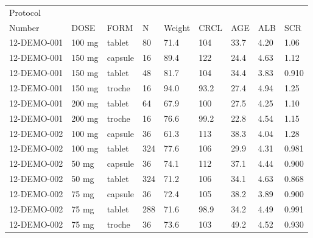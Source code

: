 \documentclass[
]{article}
\newenvironment{Shaded}{\begin{snugshade}}{\end{snugshade}}
\newcommand{\ControlFlowTok}[1]{\textcolor[rgb]{0.13,0.29,0.53}{\textbf{#1}}}
\newcommand{\DataTypeTok}[1]{\textcolor[rgb]{0.13,0.29,0.53}{#1}}
\newcommand{\KeywordTok}[1]{\textcolor[rgb]{0.13,0.29,0.53}{\textbf{#1}}}
\newcommand{\NormalTok}[1]{#1}
\newcommand{\OperatorTok}[1]{\textcolor[rgb]{0.81,0.36,0.00}{\textbf{#1}}}
\newcommand{\StringTok}[1]{\textcolor[rgb]{0.31,0.60,0.02}{#1}}
\begin{document}
\begin{table}[h]
\centering
{\def\arraystretch{1.4}\tabcolsep=5pt
\begin{threeparttable}
\begin{tabular}[h]{lllllllll}
\hline
Protocol &  &  &  &  &  &  &  &  \\ [-0.56em]
Number & DOSE & FORM & N & Weight & CRCL & AGE & ALB & SCR \\
\hline
12-DEMO-001 & 100 mg & tablet & 80 & 71.4 & 104 & 33.7 & 4.20 & 1.06 \\
12-DEMO-001 & 150 mg & capsule & 16 & 89.4 & 122 & 24.4 & 4.63 & 1.12 \\
12-DEMO-001 & 150 mg & tablet & 48 & 81.7 & 104 & 34.4 & 3.83 & 0.910 \\
12-DEMO-001 & 150 mg & troche & 16 & 94.0 & 93.2 & 27.4 & 4.94 & 1.25 \\
12-DEMO-001 & 200 mg & tablet & 64 & 67.9 & 100 & 27.5 & 4.25 & 1.10 \\
12-DEMO-001 & 200 mg & troche & 16 & 76.6 & 99.2 & 22.8 & 4.54 & 1.15 \\
12-DEMO-002 & 100 mg & capsule & 36 & 61.3 & 113 & 38.3 & 4.04 & 1.28 \\
12-DEMO-002 & 100 mg & tablet & 324 & 77.6 & 106 & 29.9 & 4.31 & 0.981 \\
12-DEMO-002 & 50 mg & capsule & 36 & 74.1 & 112 & 37.1 & 4.44 & 0.900 \\
12-DEMO-002 & 50 mg & tablet & 324 & 71.2 & 106 & 34.1 & 4.63 & 0.868 \\
12-DEMO-002 & 75 mg & capsule & 36 & 72.4 & 105 & 38.2 & 3.89 & 0.900 \\
12-DEMO-002 & 75 mg & tablet & 288 & 71.6 & 98.9 & 34.2 & 4.49 & 0.991 \\
12-DEMO-002 & 75 mg & troche & 36 & 73.6 & 103 & 49.2 & 4.52 & 0.930 \\
\hline
\end{tabular}
\end{threeparttable}
}
\end{table}

\begin{Shaded}
\end{Shaded}
\end{document}
